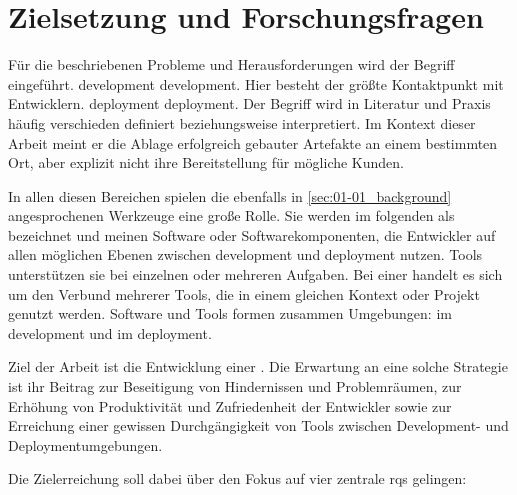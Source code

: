 \section{Zielsetzung und Forschungsfragen}
\label{sec:01-03_objectives-and-research-questions}

Für die beschriebenen Probleme und Herausforderungen wird der Begriff  eingeführt. \Gls{development} \glsdesc{development}. Hier besteht der größte Kontaktpunkt mit Entwicklern. \Gls{deployment} \glsdesc{deployment}. Der Begriff wird in Literatur und Praxis häufig verschieden definiert beziehungsweise interpretiert. Im Kontext dieser Arbeit meint er die Ablage erfolgreich gebauter Artefakte an einem bestimmten Ort, aber explizit nicht ihre Bereitstellung für mögliche Kunden.

In allen diesen Bereichen spielen die ebenfalls in \autoref{sec:01-01_background} angesprochenen Werkzeuge eine große Rolle. Sie werden im folgenden als  bezeichnet und meinen Software oder Softwarekomponenten, die Entwickler auf allen möglichen Ebenen zwischen \Gls{development} und \Gls{deployment} nutzen. Tools unterstützen sie bei einzelnen oder mehreren Aufgaben. Bei einer  handelt es sich um den Verbund mehrerer Tools, die in einem gleichen Kontext oder Projekt genutzt werden. Software und Tools formen zusammen Umgebungen:  im \Gls{development} und  im \Gls{deployment}.

Ziel der Arbeit ist die Entwicklung einer . Die Erwartung an eine solche Strategie ist ihr Beitrag zur Beseitigung von Hindernissen und Problemräumen, zur Erhöhung von Produktivität und Zufriedenheit der Entwickler sowie zur Erreichung einer gewissen Durchgängigkeit von Tools zwischen Development- und Deploymentumgebungen.

Die Zielerreichung soll dabei über den Fokus auf vier zentrale \Glspl{rq} gelingen:

